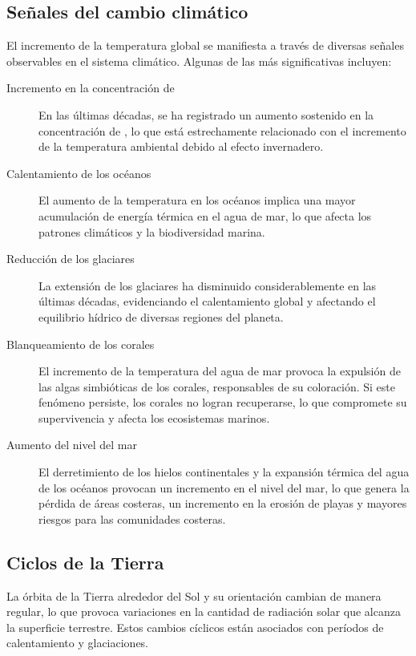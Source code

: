 \subsection{Señales del cambio climático}

El incremento de la temperatura global se manifiesta a través de diversas señales observables en el sistema climático. Algunas de las más significativas incluyen:

\begin{description}
    \item[Incremento en la concentración de ] En las últimas décadas, se ha registrado un aumento sostenido en la concentración de , lo que está estrechamente relacionado con el incremento de la temperatura ambiental debido al efecto invernadero.
    
    \item[Calentamiento de los océanos] El aumento de la temperatura en los océanos implica una mayor acumulación de energía térmica en el agua de mar, lo que afecta los patrones climáticos y la biodiversidad marina.
    
    \item[Reducción de los glaciares] La extensión de los glaciares ha disminuido considerablemente en las últimas décadas, evidenciando el calentamiento global y afectando el equilibrio hídrico de diversas regiones del planeta.
    
    \item[Blanqueamiento de los corales] El incremento de la temperatura del agua de mar provoca la expulsión de las algas simbióticas de los corales, responsables de su coloración. Si este fenómeno persiste, los corales no logran recuperarse, lo que compromete su supervivencia y afecta los ecosistemas marinos.
    
    \item[Aumento del nivel del mar] El derretimiento de los hielos continentales y la expansión térmica del agua de los océanos provocan un incremento en el nivel del mar, lo que genera la pérdida de áreas costeras, un incremento en la erosión de playas y mayores riesgos para las comunidades costeras.
\end{description}

\subsection{Ciclos de la Tierra}

La órbita de la Tierra alrededor del Sol y su orientación cambian de manera regular, lo que provoca variaciones en la cantidad de radiación solar que alcanza la superficie terrestre. Estos cambios cíclicos están asociados con períodos de calentamiento y glaciaciones. 

